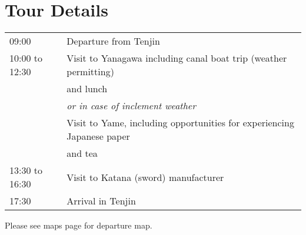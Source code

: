 \section{Tour Details}

\noindent\begin{tabular}{|l|l|}
    \hline
    09:00           & Departure from Tenjin\\
    10:00 to 12:30  & Visit to Yanagawa including canal boat trip (weather permitting) \\
                    & and lunch\\
                    & \emph{or in case of inclement weather} \\
                    & Visit to Yame, including opportunities for experiencing Japanese paper \\
                    & and tea \\
    13:30 to 16:30  & Visit to Katana (sword) manufacturer \\
    17:30           & Arrival in Tenjin\\
    \hline
\end{tabular}

\vspace{1em}
Please see maps page for departure map.
